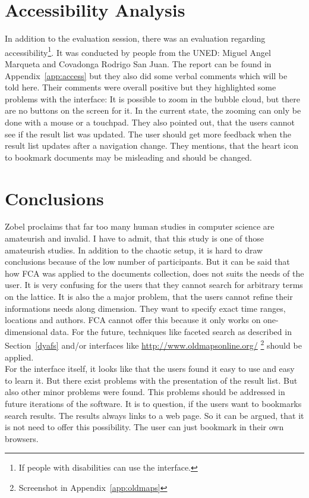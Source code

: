 \documentclass[11pt]{report}
\begin{document}
\section{Accessibility Analysis}

In addition to the evaluation session, there was an evaluation regarding accessibility\footnote{If people with disabilities can use the interface.}. It was conducted by people from the UNED: Miguel Angel Marqueta and Covadonga Rodrigo San Juan. The report can be found in Appendix~\ref{app:access} but they also did some verbal comments which will be told here. Their comments were overall positive but they highlighted some problems with the interface: It is possible to zoom in the bubble cloud, but there are no buttons on the screen for it. In the current state, the zooming can only be done with a mouse or a touchpad. They also pointed out, that the users cannot see if the result list was updated. The user should get more feedback when the result list updates after a navigation change. They mentions, that the heart icon to bookmark documents may be misleading and should be changed. 

\section{Conclusions} 
Zobel \cite{Zobel2004} proclaims that far too many human studies in computer science are amateurish and invalid. I have to admit, that this study is one of those amateurish studies. In addition to the chaotic setup, it is hard to draw conclusions because of the low number of participants. But it can be said that how FCA was applied to the documents collection, does not suits the needs of the user. It is very confusing for the users that they cannot search for arbitrary terms on the lattice. It is also the a major problem, that the users cannot refine their informations needs along dimension. They want to specify exact time ranges, locations and authors. FCA cannot offer this because it only works on one-dimensional data. For the future, techniques like faceted search as described in Section~\ref{dyafs} and/or interfaces like \url{http://www.oldmapsonline.org/} \footnote{Screenshot in Appendix~\ref{app:oldmaps}} should be applied.\\
 
For the interface itself, it looks like that the users found it easy to use and easy to learn it. But there exist problems with the presentation of the result list. But also other minor problems were found. This problems should be addressed in future iterations of the software. It is to question, if the users want to bookmarks search results. The results always links to a web page. So it can be argued, that it is not need to offer this possibility. The user can just bookmark in their own browsers.
\end{document}
